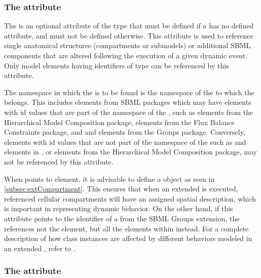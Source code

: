 \subsubsection{The  attribute}
\label{attr:idRef}

The  is an optional attribute of the type  that must be defined if a \DynElement has no defined  attribute, and must not be defined otherwise. This attribute is used to reference single anatomical structures (compartments or submodels) or additional SBML components that are altered following the execution of a given dynamic event. Only model elements having identifiers of type  can be referenced by this attribute. 

The namespace in which the  is to be found is the  namespace of the \Model to which the \DynElement belongs. This includes elements from SBML packages which may have elements with id values that are part of the  namespace of the \Model, such as  elements from the Hierarchical Model Composition package,  elements from the Flux Balance Constraints package, and  and  elements from the Groups package. Conversely, elements with id values that are not part of the  namespace of the \Model such as \UnitDefinition and \LocalParameter elements in \sbmlthreecore, or  elements from the Hierarchical Model Composition package, may not be referenced by this  attribute.

When  points to \Compartment element, it is advisable to define a \ListOfSpatialComponents object as seen in \ref{subsec:extCompartment}. This ensures that when an extended \Event is executed, referenced cellular compartments will have an assigned spatial description, which is important in representing dynamic behavior. On the other hand, if this attribute points to the identifier of a  from the SBML Groups extension, the \DynElement references not the  element, but all the elements within instead. For a complete description of how \DynElement class instances are affected by different behaviors modeled in an extended \Event, refer to .

\subsubsection{The  attribute}
\label{attr:metaIdRef}

